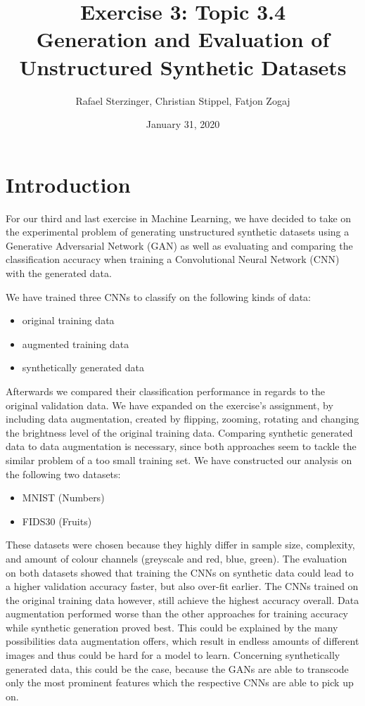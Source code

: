 \documentclass[13pt]{article}
\title{Exercise 3: Topic 3.4\\ Generation and Evaluation of Unstructured Synthetic Datasets}
\author{Rafael Sterzinger, Christian Stippel, Fatjon Zogaj}
\date{January 31, 2020}
\begin{document}
\maketitle

\section{Introduction} \label{sec:introduction}
For our third and last exercise in Machine Learning, we have decided to take on the experimental problem of generating unstructured synthetic datasets using a Generative Adversarial Network (GAN) as well as evaluating and comparing the classification accuracy when training a Convolutional Neural Network (CNN) with the generated data.

We have trained three CNNs to classify on the following kinds of data:
\begin{itemize}
    \item original training data
    \item augmented training data
    \item synthetically generated data
\end{itemize}

Afterwards we compared their classification performance in regards to the original validation data. We have expanded on the exercise's assignment, by including data augmentation, created by flipping, zooming, rotating and changing the brightness level of the original training data. Comparing synthetic generated data to data augmentation is necessary, since both approaches seem to tackle the similar problem of a too small training set.
We have constructed our analysis on the following two datasets:

\begin{itemize}
    \item MNIST (Numbers)
    \item FIDS30 (Fruits)
\end{itemize}

These datasets were chosen because they highly differ in sample size, complexity, and amount of colour channels (greyscale and red, blue, green). The evaluation on both datasets showed that training the CNNs on synthetic data could lead to a higher validation accuracy faster, but also over-fit earlier. The CNNs trained on the original training data however, still achieve the highest accuracy overall. Data augmentation performed worse than the other approaches for training accuracy while synthetic generation proved best. This could be explained by the many possibilities data augmentation offers, which result in endless amounts of different images and thus could be hard for a model to learn. Concerning synthetically generated data, this could be the case, because the GANs are able to transcode only the most prominent features which the respective CNNs are able to pick up on.
\end{document}
